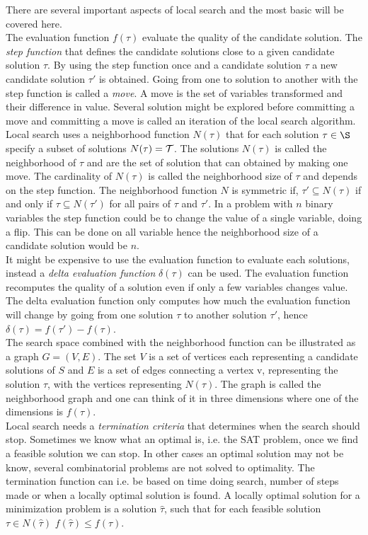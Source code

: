 There are several important aspects of local search and the most basic will be covered here. \\The evaluation function 
$f(\tau)$ evaluate the quality of the candidate solution. 
The \emph{step function} that defines the candidate solutions close to a given candidate solution $\tau$. By using the 
step function once and a candidate solution $\tau$ a new candidate solution $\tau'$ is obtained. Going from one to 
solution to another with the step function is called a \emph{move}. A move is the set of variables transformed 
and their difference in value. Several solution might be explored before committing a move and committing 
a move is called an iteration of the local search algorithm.  Local search uses a neighborhood function $N(\tau)$ that 
for each solution $\tau \in \S$ specify a subset of solutions $N(\tau) = \mathcal{T}$. The solutions $N(\tau)$ is called the 
neighborhood of $\tau$ and are the set of solution that can obtained by making one move. The cardinality of $N(\tau)$ is 
called the neighborhood size of $\tau$ and depends on the step function. The neighborhood function $N$ is symmetric if, 
$\tau' \subseteq N(\tau)$ if and only if $\tau \subseteq N(\tau')$ for all pairs of $\tau$ and $\tau'$. In a problem 
with $n$ binary variables the step function could be to change the value of a single variable, doing a flip. This can be 
done on all variable hence the neighborhood size of a candidate solution would be $n$. \\ 
It might be expensive to use the evaluation function to evaluate each solutions, instead a \emph{delta evaluation 
function} $\delta(\tau)$ can be used. The evaluation function recomputes the quality of a solution even if only a few 
variables changes value. The delta evaluation function only computes how much the evaluation function will change by 
going from one solution $\tau$ to another solution $\tau'$, hence $\delta(\tau) = f(\tau')-f(\tau)$. \\
The search space combined with the neighborhood function can be illustrated as a graph $G= (V,E)$. The set $V$ is a set 
of vertices each representing a candidate solutions of $S$ and $E$ is a set of edges connecting a vertex v, representing 
the solution $\tau$, with the vertices representing $N(\tau)$. The graph is called the neighborhood graph and one can 
think of it in three dimensions where one of the dimensions is $f(\tau)$. \cite[p. 3-5]{lsbog} \\ 
Local search needs a \emph{termination criteria} that determines when the search should stop. Sometimes we know what 
an optimal is, i.e. the SAT problem, once we find a feasible solution we can stop. In other cases an optimal solution 
may not be know, several combinatorial problems are not solved to optimality. The termination function can i.e. be based 
on time doing search, number of steps made or when a locally optimal solution is found. A locally optimal solution for 
a minimization problem is a solution $\hat{\tau}$, such that for each feasible solution $\tau \in N(\hat{\tau})$ 
$f(\hat{\tau}) \leq f(\tau)$. \\

